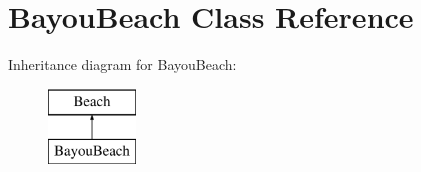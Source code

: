 \hypertarget{class_bayou_beach}{}\section{Bayou\+Beach Class Reference}
\label{class_bayou_beach}
Inheritance diagram for Bayou\+Beach\+:\begin{figure}[H]
\begin{center}
\leavevmode
\includegraphics[height=2.000000cm]{class_bayou_beach}
\end{center}
\end{figure}
